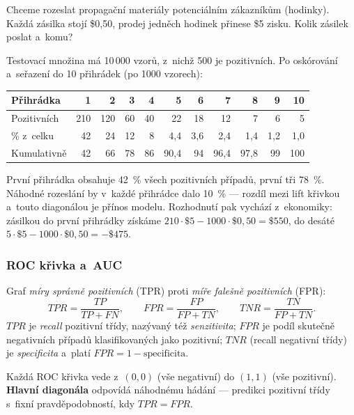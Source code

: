 \documentclass[11pt,a4paper]{article}
\theoremstyle{definition}
\begin{document}
\begin{defbox}
Chceme rozeslat propagační materiály potenciálním zákazníkům (hodinky). Každá zásilka stojí
\$0,50, prodej jedněch hodinek přinese \$5 zisku. Kolik zásilek poslat a~komu?

Testovací množina má 10\,000 vzorů, z~nichž 500 je pozitivních. Po oskórování a~seřazení do
10 přihrádek (po 1000 vzorech):

\begin{center}
\small
\begin{tabular}{@{}lrrrrrrrrrr@{}}
\toprule
Přihrádka & 1 & 2 & 3 & 4 & 5 & 6 & 7 & 8 & 9 & 10 \\
\midrule
Pozitivních & 210 & 120 & 60 & 40 & 22 & 18 & 12 & 7 & 6 & 5 \\
\% z~celku & 42 & 24 & 12 & 8 & 4,4 & 3,6 & 2,4 & 1,4 & 1,2 & 1,0 \\
Kumulativně & 42 & 66 & 78 & 86 & 90,4 & 94 & 96,4 & 97,8 & 99 & 100 \\
\bottomrule
\end{tabular}
\end{center}

První přihrádka obsahuje 42~\% všech pozitivních případů, první tři 78~\%. Náhodné rozeslání
by v~každé přihrádce dalo 10~\% --- rozdíl mezi lift křivkou a~touto diagonálou je přínos
modelu. Rozhodnutí  pak vychází z~ekonomiky: zásilkou do první přihrádky
získáme $210\cdot\$5-1000\cdot\$0{,}50=\$550$, do desáté
$5\cdot\$5-1000\cdot\$0{,}50=-\$475$.
\end{defbox}

\subsubsection{ROC křivka a~AUC}

\begin{defbox}
Graf \emph{míry správně pozitivních} (TPR) proti \emph{míře falešně pozitivních} (FPR):
\[ \mathit{TPR}=\frac{TP}{TP+FN},\qquad \mathit{FPR}=\frac{FP}{FP+TN},\qquad
   \mathit{TNR}=\frac{TN}{FP+TN}. \]
$\mathit{TPR}$ je \emph{recall} pozitivní třídy, nazývaný též \emph{senzitivita};
$\mathit{FPR}$ je podíl skutečně negativních případů klasifikovaných jako pozitivní;
$\mathit{TNR}$ (recall negativní třídy) je \emph{specificita} a~platí
$\mathit{FPR}=1-\text{specificita}$.

Každá ROC křivka vede z~$(0,0)$ (vše negativní) do $(1,1)$ (vše pozitivní). \textbf{Hlavní
diagonála} odpovídá náhodnému hádání --- predikci pozitivní třídy s~fixní pravděpodobností, kdy
$\mathit{TPR}=\mathit{FPR}$.
\end{defbox}
\end{document}
